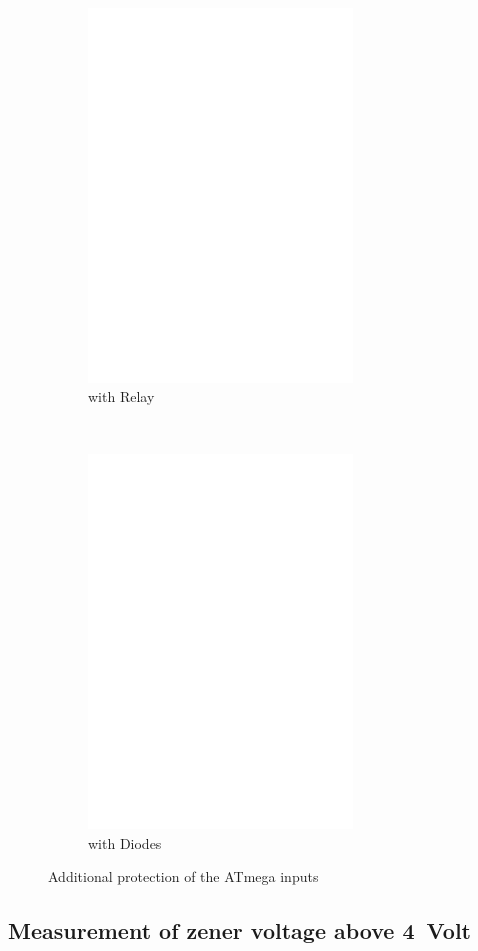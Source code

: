 \begin{figure}[H]
  \begin{subfigure}[b]{9cm}
    \centering
    \includegraphics[width=7cm]{../FIG/relay_addon.eps}
    \caption{with Relay}
  \end{subfigure}
  ~
  \begin{subfigure}[b]{9cm}
    \centering
    \includegraphics[width=7cm]{../FIG/diode_addon.eps}
    \caption{with Diodes}
  \end{subfigure}
  \caption{Additional protection of the ATmega inputs}
  \label{fig:relay_addon}
\end{figure}

\subsection{Measurement of zener voltage above 4~Volt}

